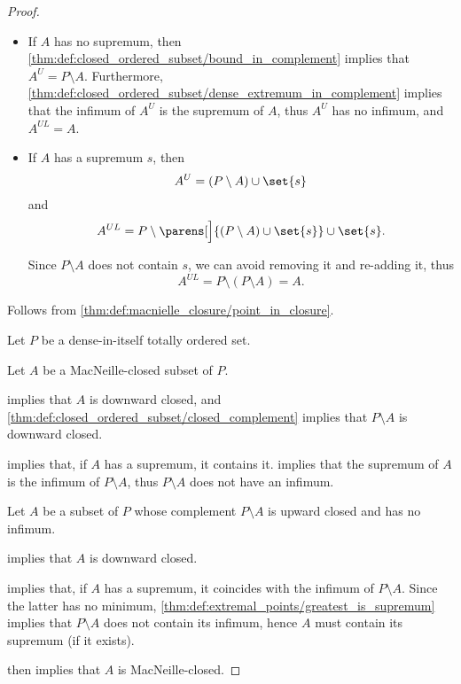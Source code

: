 \begin{proof}
  \begin{itemize}
    \item If \( A \) has no supremum, then \cref{thm:def:closed_ordered_subset/bound_in_complement} implies that \( A^U = P \setminus A \). Furthermore, \cref{thm:def:closed_ordered_subset/dense_extremum_in_complement} implies that the infimum of \( A^U \) is the supremum of \( A \), thus \( A^U \) has no infimum, and \( A^{UL} = A \).

    \item If \( A \) has a supremum \( s \), then
    \begin{equation*}
      A^U = (P \setminus A) \cup \set{ s }
    \end{equation*}
    and
    \begin{equation*}
      A^{UL}
      =
      P \setminus \parens[\Big]{ (P \setminus A) \cup \set{ s } } \cup \set{ s }.
    \end{equation*}

    Since \( P \setminus A \) does not contain \( s \), we can avoid removing it and re-adding it, thus
    \begin{equation*}
      A^{UL} = P \setminus (P \setminus A) = A.
    \end{equation*}
  \end{itemize}

  Follows from \cref{thm:def:macnielle_closure/point_in_closure}.

   Let \( P \) be a dense-in-itself totally ordered set.

  \SufficiencySubProof* Let \( A \) be a MacNeille-closed subset of \( P \).

   implies that \( A \) is downward closed, and \cref{thm:def:closed_ordered_subset/closed_complement} implies that \( P \setminus A \) is downward closed.

   implies that, if \( A \) has a supremum, it contains it.  implies that the supremum of \( A \) is the infimum of \( P \setminus A \), thus \( P \setminus A \) does not have an infimum.

  \NecessitySubProof* Let \( A \) be a subset of \( P \) whose complement \( P \setminus A \) is upward closed and has no infimum.

   implies that \( A \) is downward closed.

   implies that, if \( A \) has a supremum, it coincides with the infimum of \( P \setminus A \). Since the latter has no minimum, \cref{thm:def:extremal_points/greatest_is_supremum} implies that \( P \setminus A \) does not contain its infimum, hence \( A \) must contain its supremum (if it exists).

   then implies that \( A \) is MacNeille-closed.
\end{proof}

